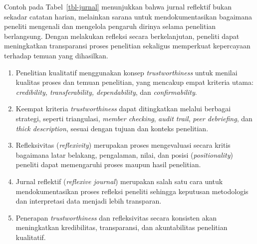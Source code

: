 \documentclass[
  indonesian,
  letterpaper,
  DIV=11,
  numbers=noendperiod]{scrreprt}
\providecommand{\tightlist}{%
  \setlength{\itemsep}{0pt}\setlength{\parskip}{0pt}}
\begin{document}
Contoh pada Tabel~\ref{tbl-jurnal} menunjukkan bahwa jurnal reflektif
bukan sekadar catatan harian, melainkan sarana untuk mendokumentasikan
bagaimana peneliti mengenali dan mengelola pengaruh dirinya selama
penelitian berlangsung. Dengan melakukan refleksi secara berkelanjutan,
peneliti dapat meningkatkan transparansi proses penelitian sekaligus
memperkuat kepercayaan terhadap temuan yang dihasilkan.

\begin{tcolorbox}[enhanced jigsaw, colframe=quarto-callout-tip-color-frame, toptitle=1mm, breakable, leftrule=.75mm, arc=.35mm, toprule=.15mm, colback=white, colbacktitle=quarto-callout-tip-color!10!white, bottomtitle=1mm, bottomrule=.15mm, titlerule=0mm, title=\textcolor{quarto-callout-tip-color}{\faLightbulb}\hspace{0.5em}{Rangkuman}, coltitle=black, left=2mm, opacitybacktitle=0.6, opacityback=0, rightrule=.15mm]

\begin{enumerate}
\def\labelenumi{\arabic{enumi}.}
\tightlist
\item
  Penelitian kualitatif menggunakan konsep \emph{trustworthiness} untuk
  menilai kualitas proses dan temuan penelitian, yang mencakup empat
  kriteria utama: \emph{credibility, transferability, dependability},
  dan \emph{confirmability}.
\item
  Keempat kriteria \emph{trustworthiness} dapat ditingkatkan melalui
  berbagai strategi, seperti triangulasi, \emph{member checking},
  \emph{audit trail}, \emph{peer debriefing}, dan \emph{thick
  description}, sesuai dengan tujuan dan konteks penelitian.
\item
  Refleksivitas (\emph{reflexivity}) merupakan proses mengevaluasi
  secara kritis bagaimana latar belakang, pengalaman, nilai, dan posisi
  (\emph{positionality}) peneliti dapat memengaruhi proses maupun hasil
  penelitian.
\item
  Jurnal reflektif (\emph{reflexive journal}) merupakan salah satu cara
  untuk mendokumentasikan proses refleksi peneliti sehingga keputusan
  metodologis dan interpretasi data menjadi lebih transparan.
\item
  Penerapan \emph{trustworthiness} dan refleksivitas secara konsisten
  akan meningkatkan kredibilitas, transparansi, dan akuntabilitas
  penelitian kualitatif.
\end{enumerate}

\end{tcolorbox}
\end{document}
